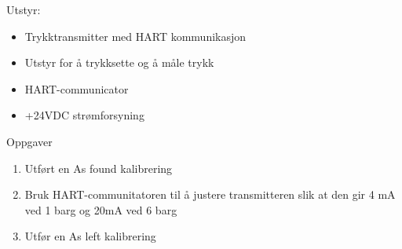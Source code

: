 Utstyr:
\begin{itemize}[noitemsep]
	\item Trykktransmitter med HART kommunikasjon 
	\item Utstyr for å trykksette og å måle trykk 
	\item HART-communicator 
	\item +24VDC strømforsyning 
\end{itemize}

Oppgaver \begin{enumerate}
	\item		Utført en As found kalibrering 
	\item		Bruk HART-communitatoren til å justere transmitteren slik at den gir 4 mA ved 1 barg og 20mA ved 6 barg 
	\item		Utfør en As left kalibrering 
\end{enumerate}




